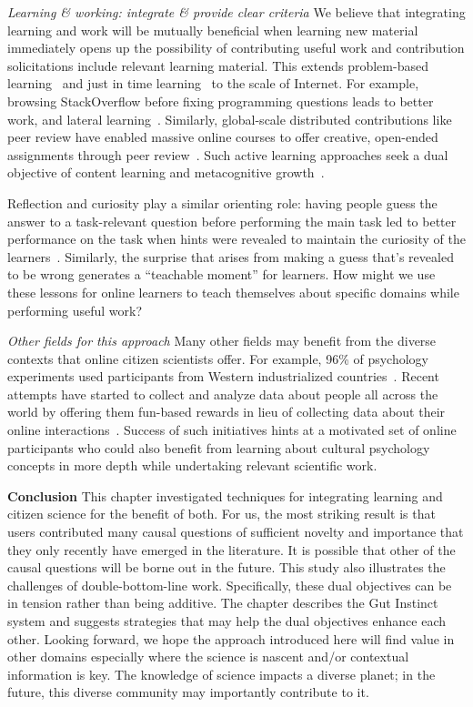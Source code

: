 \textit{Learning \& working: integrate \& provide clear criteria}
We believe that integrating learning and work will be mutually beneficial when learning new material immediately opens up the possibility of contributing useful work and contribution solicitations include relevant learning material. This extends problem-based learning~\cite{Savery1995} and just in time learning~\cite{Bolton1999} to the scale of Internet. For example, browsing StackOverflow before fixing programming questions leads to better work, and lateral learning~\cite{Mamykina2011}. Similarly, global-scale distributed contributions like peer review have enabled massive online courses to offer creative, open-ended assignments through peer review~\cite{Kulkarni2013peer}. Such active learning approaches seek a dual objective of content learning and metacognitive growth~\cite{Crouch2001}.
 
Reflection and curiosity play a similar orienting role: having people guess the answer to a task-relevant question before performing the main task led to better performance on the task when hints were revealed to maintain the curiosity of the learners~\cite{Aleven2006, Law2016a}. Similarly, the surprise that arises from making a guess that’s revealed to be wrong generates a “teachable moment” for learners. How might we use these lessons for online learners to teach themselves about specific domains while performing useful work? 

\textit{Other fields for this approach}
Many other fields may benefit from the diverse contexts that online citizen scientists offer. For example, 96\% of psychology experiments used participants from Western industrialized countries~\cite{Henrich2010a}. Recent attempts have started to collect and analyze data about people all across the world by offering them fun-based rewards in lieu of collecting data about their online interactions~\cite{Reinecke2015}. Success of such initiatives hints at a motivated set of online participants who could also benefit from learning about cultural psychology concepts in more depth while undertaking relevant scientific work. 

\textbf{Conclusion}
This chapter investigated techniques for integrating learning and citizen science for the benefit of both. For us, the most striking result is that users contributed many causal questions of sufficient novelty and importance that they only recently have emerged in the literature. It is possible that other of the causal questions will be borne out in the future. This study also illustrates the challenges of double-bottom-line work. Specifically, these dual objectives can be in tension rather than being additive. The chapter describes the Gut Instinct system and suggests strategies that may help the dual objectives enhance each other. Looking forward, we hope the approach introduced here will find value in other domains especially where the science is nascent and/or contextual information is key. The knowledge of science impacts a diverse planet; in the future, this diverse community may importantly contribute to it.




